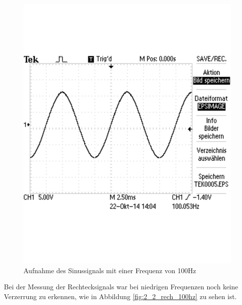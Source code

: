 \documentclass[12pt,a4paper]{article}
\begin{document}
\begin{figure}[H] 
  \centering
    \includegraphics[scale = 0.4]{2_2_sin_100hz.pdf}
  	\caption[Aufnahme des Sinussignals mit einer Frequenz von 100Hz]{Aufnahme des Sinussignals mit einer Frequenz von 100Hz}
  \label{fig:2_2_sin_100hz}
\end{figure}

Bei der Messung der Rechtecksignals war bei niedrigen Frequenzen noch keine Verzerrung zu erkennen, wie in Abbildung \ref{fig:2_2_rech_100hz} zu sehen ist.
\end{document}
